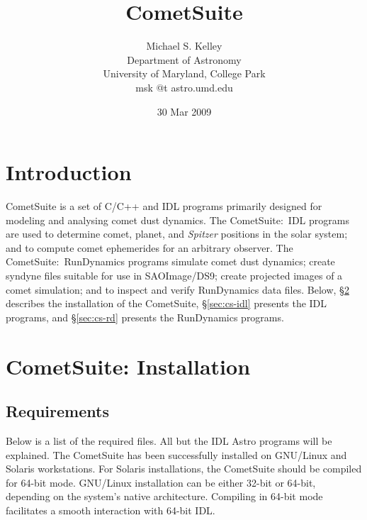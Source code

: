 \documentclass[12pt,letterpaper]{article}
\newcommand\spitzer{\textit{Spitzer}}
\newcommand\rundynamics{RunDynamics}
\newcommand\cs{CometSuite}
\begin{document}
\title{CometSuite}
\author{Michael S. Kelley\\
Department of Astronomy\\
University of Maryland, College Park\\
{\small msk @t astro.umd.edu}}

\date{30 Mar 2009}
\maketitle
\tableofcontents

\clearpage

\section{Introduction}
\cs{} is a set of C/C++ and IDL programs primarily designed for
modeling and analysing comet dust dynamics.  The \cs{}:~IDL programs
are used to determine comet, planet, and \spitzer{} positions in the
solar system; and to compute comet ephemerides for an arbitrary
observer.  The \cs{}:~\rundynamics{} programs simulate comet dust
dynamics; create syndyne files suitable for use in SAOImage/DS9;
create projected images of a comet simulation; and to inspect and
verify \rundynamics{} data files.  Below, \S\ref{sec:cs-install}
describes the installation of the \cs{}, \S\ref{sec:cs-idl} presents
the IDL programs, and \S\ref{sec:cs-rd} presents the \rundynamics{}
programs.

\section{CometSuite: Installation}\label{sec:cs-install}

\lstset{language=csh,basicstyle=\normalsize\ttfamily\singlespacing,
  showstringspaces=false,columns=fullflexible}

\subsection{Requirements}
Below is a list of the required files.  All but the IDL Astro programs
will be explained.  The \cs{} has been successfully installed on
GNU/Linux and Solaris workstations.  For Solaris installations, the
\cs{} should be compiled for 64-bit mode.  GNU/Linux installation can
be either 32-bit or 64-bit, depending on the system's native
architecture.  Compiling in 64-bit mode facilitates a smooth
interaction with 64-bit IDL.
\end{document}
